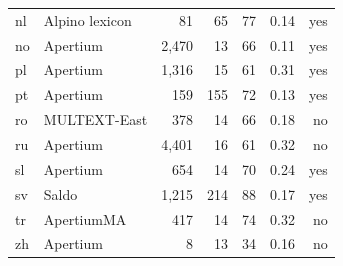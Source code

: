 \documentclass[11pt,a4paper]{article}
\begin{document}
\begin{table}[t]
\begin{tabular}{llrrr|rr}
nl &  Alpino lexicon  & 81 & 65 & 77 & 0.14&yes\\
no & Apertium & 2,470 & 13 & 66 & 0.11 & yes\\
pl & Apertium & 1,316 &  15 & 61 & 0.31 & yes\\
pt & Apertium & 159 & 155 & 72 & 0.13 & yes\\
ro &  MULTEXT-East  & 378 & 14 & 66 & 0.18 & no \\
ru & Apertium & 4,401 &16& 61 & 0.32 & no  \\
sl & Apertium & 654 & 14 & 70 & 0.24 &yes\\
sv & Saldo & 1,215 & 214 & 88 & 0.17 & yes\\
tr & ApertiumMA & 417 & 14 & 74 & 0.32  &no \\
zh & Apertium & 8 & 13 & 34 & 0.16 & no \\

\end{tabular}
\end{table}
\end{document}
